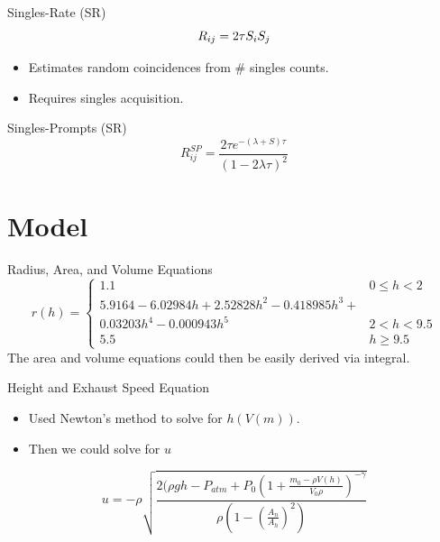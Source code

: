 \documentclass[pdf]{beamer}
\begin{document}
\begin{frame}{Singles-Rate (SR)}
    $$R_{ij} = 2 \rn{tau}{\tau} \rn{si}{S_i} \rn{sj}{S_j}$$

    \vspace{2em}

    \begin{itemize}
        \item Estimates random coincidences from \# singles counts. 
        \item Requires singles acquisition.
    \end{itemize}
\end{frame}

\begin{frame}{Singles-Prompts (SR)}
    $$R_{ij}^{SP} = \frac{2 \tau e^{-(\lambda + S) \tau}}{(1 - 2 \lambda \tau)^2 }$$
\end{frame}

\section{Model}

\begin{frame}{Radius, Area, and Volume Equations}
    $$r(h) = \begin{cases}
    1.1 & 0 \leq h < 2 \\
    5.9164-6.02984h+2.52828h^2-0.418985h^3 + \\ 0.03203h^4 -0.000943h^5 & 2 < h < 9.5 \\
    5.5 & h \geq 9.5
\end{cases}$$
    The area and volume equations could then be easily derived via integral.
\end{frame}

\begin{frame}{Height and Exhaust Speed Equation}
    \begin{itemize}
        \item Used Newton's method to solve for $h(V(m))$.
        \item Then we could solve for $u$
    \end{itemize}


    $$u = -\rho \sqrt{\frac{2(\rho g h - P_{atm} + P_0 (1 + \frac{m_0 - \rho V(h)}{V_0 \rho})^{-\gamma}}{\rho (1 - (\frac{A_n}{A_h})^2)}}$$
\end{frame}
\end{document}

